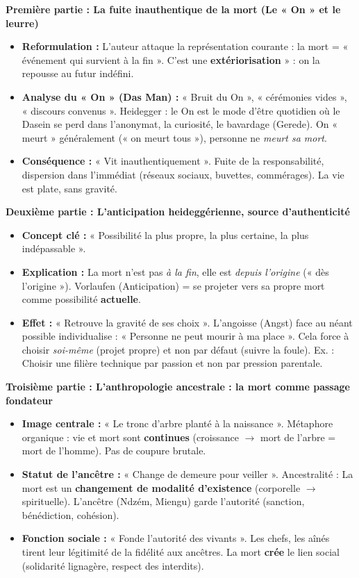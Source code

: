 \documentclass[11pt]{article}
\newcommand{\cle}[1]{{\popxbold\color{popdark}#1}}
\begin{document}
\begin{exoresolu}
\textbf{Première partie : La fuite inauthentique de la mort (Le « On » et le leurre)}
\begin{itemize}
    \item \textbf{Reformulation :} L'auteur attaque la représentation courante : la mort = « événement qui survient à la fin ». C'est une \textbf{extériorisation} » : on la repousse au futur indéfini.
    \item \textbf{Analyse du « On » (Das Man) :} « Bruit du On », « cérémonies vides », « discours convenus ». Heidegger : le \cle{On} est le mode d'être quotidien où le Dasein se perd dans l'anonymat, la curiosité, le bavardage (Gerede). On « meurt » généralement (« on meurt tous »), personne ne \emph{meurt sa mort}.
    \item \textbf{Conséquence :} « Vit inauthentiquement ». Fuite de la responsabilité, dispersion dans l'immédiat (réseaux sociaux, buvettes, commérages). La vie est plate, sans gravité.
\end{itemize}

\textbf{Deuxième partie : L'anticipation heideggérienne, source d'authenticité}
\begin{itemize}
    \item \textbf{Concept clé :} « Possibilité la plus propre, la plus certaine, la plus indépassable ».
    \item \textbf{Explication :} La mort n'est pas \emph{à la fin}, elle est \emph{depuis l'origine} (« dès l'origine »). \cle{Vorlaufen} (Anticipation) = se projeter vers sa propre mort comme possibilité \textbf{actuelle}.
    \item \textbf{Effet :} « Retrouve la gravité de ses choix ». L'angoisse (Angst) face au néant possible individualise : « Personne ne peut mourir à ma place ». Cela force à choisir \emph{soi-même} (projet propre) et non par défaut (suivre la foule). Ex. : Choisir une filière technique par passion et non par pression parentale.
\end{itemize}

\textbf{Troisième partie : L'anthropologie ancestrale : la mort comme passage fondateur}
\begin{itemize}
    \item \textbf{Image centrale :} « Le tronc d'arbre planté à la naissance ». Métaphore organique : vie et mort sont \textbf{continues} (croissance $\to$ mort de l'arbre = mort de l'homme). Pas de coupure brutale.
    \item \textbf{Statut de l'ancêtre :} « Change de demeure pour veiller ». \cle{Ancestralité} : La mort est un \textbf{changement de modalité d'existence} (corporelle $\to$ spirituelle). L'ancêtre (Ndzém, Miengu) garde l'\cle{autorité} (sanction, bénédiction, cohésion).
    \item \textbf{Fonction sociale :} « Fonde l'autorité des vivants ». Les chefs, les aînés tirent leur légitimité de la fidélité aux ancêtres. La mort \textbf{crée} le lien social (solidarité lignagère, respect des interdits).
\end{itemize}


\end{exoresolu}
\end{document}
